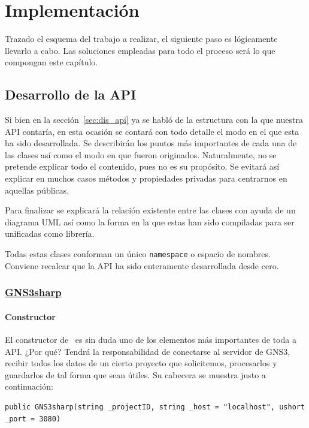 \chapter{Implementación}\label{chap:Integration}
Trazado el esquema del trabajo a realizar, el siguiente paso es lógicamente llevarlo a cabo. Las soluciones empleadas para todo el proceso será lo que compongan este capítulo.

\section{Desarrollo de la API}
Si bien en la sección~\ref{sec:dis_api} ya se habló de la estructura con la que nuestra API contaría, en esta ocasión se contará con todo detalle el modo en el que esta ha sido desarrollada. Se describirán los puntos más importantes de cada una de las clases así como el modo en que fueron originados. Naturalmente, no se pretende explicar todo el contenido, pues no es su propósito. Se evitará así explicar en muchos casos métodos y propiedades privadas para centrarnos en aquellas públicas.

Para finalizar se explicará la relación existente entre las clases con ayuda de un diagrama UML así como la forma en la que estas han sido compiladas para ser unificadas como librería.

Todas estas clases conforman un único \texttt{namespace} o espacio de nombres. Conviene recalcar que la API ha sido enteramente desarrollada desde cero.

\subsection[GNS3sharp]{\href{https://github.com/aorestr/GNS3sharp/blob/master/gsn3sharp.cs}{GNS3sharp}}\label{subsec:gnscsclass}
\subsubsection{Constructor}
El constructor de \GNSCS~es sin duda uno de los elementos más importantes de toda a API. ¿Por qué? Tendrá la responsabilidad de conectarse al servidor de GNS3, recibir todos los datos de un cierto proyecto que solicitemos, procesarlos y guardarlos de tal forma que sean útiles. Su cabecera se muestra justo a continuación:
\begin{lstlisting}[language={[Sharp]C}, caption={Cabecera del constructor de \texttt{GNS3sharp}}, label={gnscs1}]
public GNS3sharp(string _projectID, string _host = "localhost", ushort _port = 3080)
\end{lstlisting}

